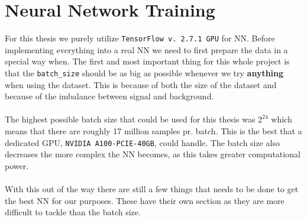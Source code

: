 \documentclass[14pt, a4paper]{book}
\begin{document}
\section{Neural Network Training}
For this thesis we purely utilize \verb|TensorFlow v. 2.7.1 GPU| for NN. Before implementing everything into a real NN we need to first prepare the data in a special way when.
The first and most important thing for this whole project is that the \verb|batch_size| should be as big as possible whenever we try \textbf{anything} when using the dataset.
This is because of both the size of the dataset and because of the imbalance between signal and background.\\
\\The highest possible batch size that could be used for this thesis was $2^{24}$ which means that there are roughly 17 million samples pr. batch. This is the best that a dedicated GPU, \verb|NVIDIA A100-PCIE-40GB|, could handle. 
The batch size also decreases the more complex the NN becomes, as this takes greater computational power.\\
\\With this out of the way there are still a few things that needs to be done to get the best NN for our purposes. These have their own section as they are more difficult to tackle than the batch size.
\end{document}
